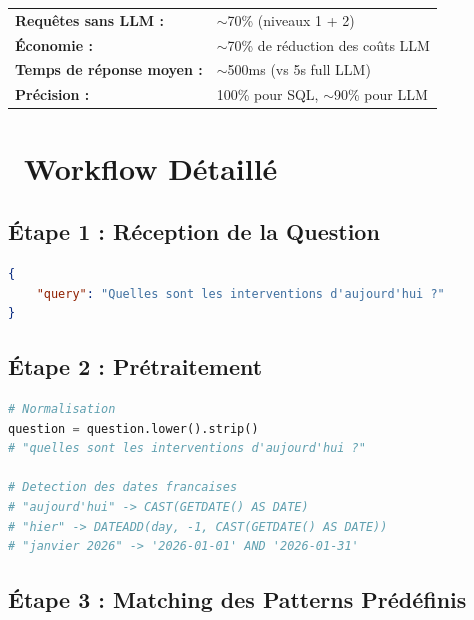\documentclass[12pt,a4paper]{article}
\begin{document}
\begin{infobox}[title={\faChartPie\ Résultats de cette Architecture}]
\begin{tabular}{ll}
    \textbf{Requêtes sans LLM :} & $\sim$70\% (niveaux 1 + 2) \\
    \textbf{Économie :} & $\sim$70\% de réduction des coûts LLM \\
    \textbf{Temps de réponse moyen :} & $\sim$500ms (vs 5s full LLM) \\
    \textbf{Précision :} & 100\% pour SQL, $\sim$90\% pour LLM \\
\end{tabular}
\end{infobox}

\newpage

\section{\faProjectDiagram\ Workflow Détaillé}

\subsection{Étape 1 : Réception de la Question}

\begin{lstlisting}[language=JSON, caption=Requête entrante]
{
    "query": "Quelles sont les interventions d'aujourd'hui ?"
}
\end{lstlisting}

\subsection{Étape 2 : Prétraitement}

\begin{lstlisting}[language=Python, caption=Prétraitement de la question]
# Normalisation
question = question.lower().strip()
# "quelles sont les interventions d'aujourd'hui ?"

# Detection des dates francaises
# "aujourd'hui" -> CAST(GETDATE() AS DATE)
# "hier" -> DATEADD(day, -1, CAST(GETDATE() AS DATE))
# "janvier 2026" -> '2026-01-01' AND '2026-01-31'
\end{lstlisting}

\subsection{Étape 3 : Matching des Patterns Prédéfinis}
\end{document}
